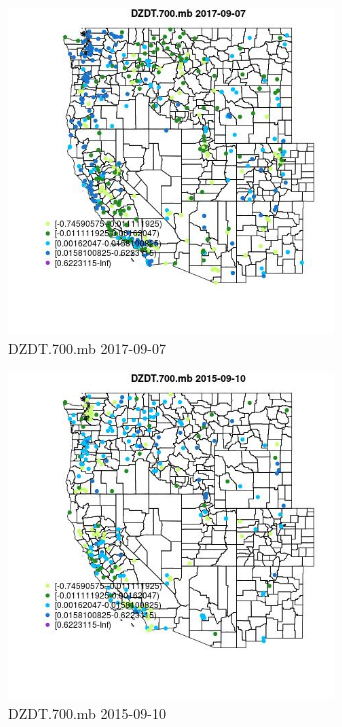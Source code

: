 \begin{figure} 
\centering  
\includegraphics[width=0.77\textwidth]{Code_Outputs/Report_ML_input_PM25_Step4_part_e_de_duplicated_aves_compiled_2019-05-20wNAs_MapObsDZDT700mb2017-09-07.jpg} 
\caption{\label{fig:Report_ML_input_PM25_Step4_part_e_de_duplicated_aves_compiled_2019-05-20wNAsMapObsDZDT700mb2017-09-07}DZDT.700.mb 2017-09-07} 
\end{figure} 
 

\begin{figure} 
\centering  
\includegraphics[width=0.77\textwidth]{Code_Outputs/Report_ML_input_PM25_Step4_part_e_de_duplicated_aves_compiled_2019-05-20wNAs_MapObsDZDT700mb2015-09-10.jpg} 
\caption{\label{fig:Report_ML_input_PM25_Step4_part_e_de_duplicated_aves_compiled_2019-05-20wNAsMapObsDZDT700mb2015-09-10}DZDT.700.mb 2015-09-10} 
\end{figure} 
 

